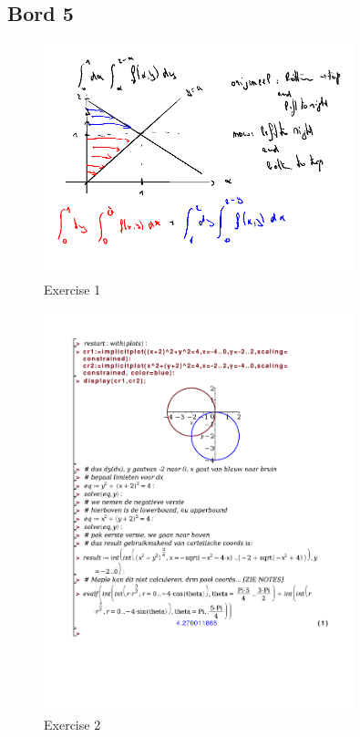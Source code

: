 \documentclass[a4paper]{report}
\begin{document}
\subsection*{Bord 5}


\begin{figure}[H]
	\centering
	\includegraphics[width=0.8\textwidth]{assets/bord_5_ex_1.png}
	\caption{Exercise 1}
	\label{fig:bord_5_ex_1}
\end{figure}

\begin{figure}[H]
	\centering
	\includegraphics[width=0.8\textwidth]{exercises/bord_5_ex_2.pdf}
	\caption{Exercise 2}
	\label{fig:bord_5_ex_2_maple}
\end{figure}
\end{document}
